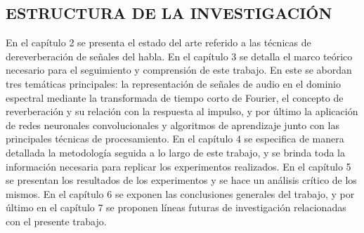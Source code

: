 \subsection[Estructura de la Investigación]{ESTRUCTURA DE LA INVESTIGACIÓN}
En el capítulo 2 se presenta el estado del arte referido a las técnicas de dereverberación de señales del habla. 
En el capítulo 3 se detalla el marco teórico necesario para el seguimiento y comprensión de este trabajo. En este se abordan tres temáticas principales: la representación de señales de audio en el dominio espectral mediante la transformada de tiempo corto de Fourier, el concepto de reverberación y su relación con la respuesta al impulso, y por último la aplicación de redes neuronales convolucionales y algoritmos de aprendizaje junto con las principales técnicas de procesamiento.  
En el capítulo 4 se especifica de manera detallada la metodología seguida a lo largo de este trabajo, y se brinda toda la información necesaria para replicar los experimentos realizados. 
En el capítulo 5 se presentan los resultados de los experimentos y se hace un análisis crítico de los mismos. 
En el capítulo 6 se exponen las conclusiones generales del trabajo, y por último en el capítulo 7 se proponen líneas futuras de investigación relacionadas con el presente trabajo. 